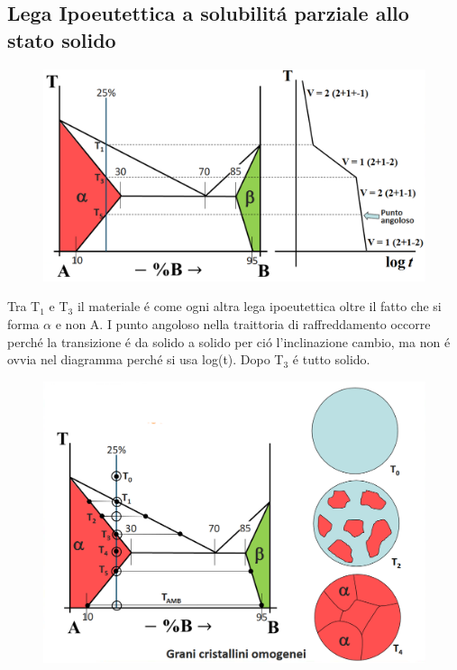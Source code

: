 \documentclass{article}
\begin{document}
{        \subsection{Lega Ipoeutettica a solubilit\'a parziale allo stato solido}
            \begin{figure}[h!]
                \centering
                \includegraphics[width=.85\linewidth]{Diagramma di stato di parziale solubilita per lega ipoeutettica e traiettoria di raffreddamento .png}
            \end{figure}
            Tra T$_1$ e T$_3$ il materiale \'e come ogni altra lega ipoeutettica oltre il fatto che si forma $\alpha$ e non A. I punto angoloso nella traittoria di raffreddamento occorre perch\'e la transizione \'e da solido a solido per ci\'o l'inclinazione cambio, ma non \'e ovvia nel diagramma perch\'e si usa log(t). Dopo T$_3$ \'e tutto solido.\\
            \newpage
            \begin{figure}[h!]
                \centering
                \includegraphics[width=.85\linewidth]{Diagramma di stato di parziale solubilita per lega ipoeutettica e cambio di struttura tra T0 e T4.png}

\end{figure}}
\end{document}
